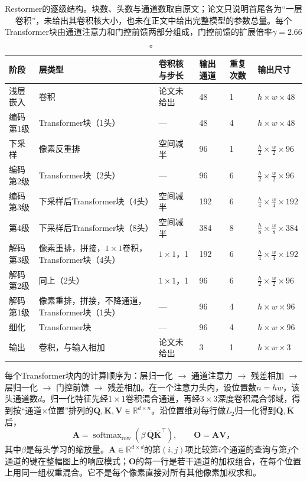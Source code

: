\begin{table}[tbp]
 \centering
 \small
 \begin{tabularx}{\linewidth}{@{}p{22mm}Xp{24mm}p{12mm}p{12mm}p{28mm}@{}}
  \toprule
  阶段 & 层类型 & 卷积核与步长 & 输出通道 & 重复次数 & 输出尺寸\\
  \midrule
  浅层嵌入 & 卷积 & 论文未给出 & 48 & 1 & $h\times w\times48$\\
  编码第1级 & Transformer块（1头） & — & 48 & 4 & $h\times w\times48$\\
  下采样 & 像素反重排 & 空间减半 & 96 & 1 & $\frac h2\times\frac w2\times96$\\
  编码第2级 & Transformer块（2头） & — & 96 & 6 & $\frac h2\times\frac w2\times96$\\
  编码第3级 & 下采样后Transformer块（4头） & 空间减半 & 192 & 6 & $\frac h4\times\frac w4\times192$\\
  第4级 & 下采样后Transformer块（8头） & 空间减半 & 384 & 8 & $\frac h8\times\frac w8\times384$\\
  解码第3级 & 像素重排，拼接，$1\times1$卷积，Transformer块（4头） & $1\times1$，1 & 192 & 6 & $\frac h4\times\frac w4\times192$\\
  解码第2级 & 同上（2头） & $1\times1$，1 & 96 & 6 & $\frac h2\times\frac w2\times96$\\
  解码第1级 & 像素重排，拼接，不降通道，Transformer块（1头） & — & 96 & 4 & $h\times w\times96$\\
  细化 & Transformer块 & — & 96 & 4 & $h\times w\times96$\\
  输出 & 卷积，与输入相加 & 论文未给出 & 3 & 1 & $h\times w\times3$\\
  \bottomrule
 \end{tabularx}
 \caption{Restormer的逐级结构。块数、头数与通道数取自原文；论文只说明首尾各为“一层卷积”，未给出其卷积核大小，也未在正文中给出完整模型的参数总量。每个Transformer块由通道注意力和门控前馈两部分组成，门控前馈的扩展倍率$\gamma=2.66$。}
 \label{tab:vision-restormer-layers}
\end{table}

每个Transformer块内的计算顺序为：层归一化 \ensuremath{\to} 通道注意力 \ensuremath{\to} 残差相加 \ensuremath{\to} 层归一化 \ensuremath{\to} 门控前馈 \ensuremath{\to} 残差相加。在一个注意力头内，设位置数$n=hw$，该头通道数$d$。归一化特征先经$1\times1$卷积混合通道，再经$3\times3$深度卷积混合邻域，得到按“通道$\times$位置”排列的$\bm{Q},\bm{K},\bm{V}\in\mathbb{R}^{d\times n}$。沿位置维对每行做$L_2$归一化得到$\bar{\bm{Q}},\bar{\bm{K}}$后，
\begin{equation}
 \bm{A}=\operatorname{softmax}_{\mathrm{row}}
       (\beta\,\bar{\bm{Q}}\bar{\bm{K}}^\top),
 \qquad
 \bm{O}=\bm{A}\bm{V}\text{，}
 \label{eq:vision-restormer-attention}
\end{equation}
其中$\beta$是每头学习的缩放量。$\bm{A}\in\mathbb{R}^{d\times d}$的第$(i,j)$项比较第$i$个通道的查询与第$j$个通道的键在整幅图上的响应模式；$\bm{O}$的每一行是若干通道的加权组合，在每个位置上用同一组权重混合。它不是每个像素直接对所有其他像素加权求和。


